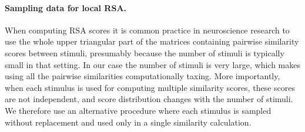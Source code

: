 \paragraph{Sampling data for local RSA.}
When computing RSA scores it is common practice in neuroscience
research to use the whole upper triangular part of the matrices
containing pairwise similarity scores between stimuli, presumably
because the number of stimuli is typically small in that setting. In
our case the number of stimuli is very large, which makes using all
the pairwise similarities computationally taxing. More importantly,
when each stimulus is used for computing multiple similarity scores,
these scores are not independent, and score distribution changes
with the number of stimuli. We therefore use an alternative procedure
where each stimulus is sampled without replacement and used only in a
single similarity calculation.


